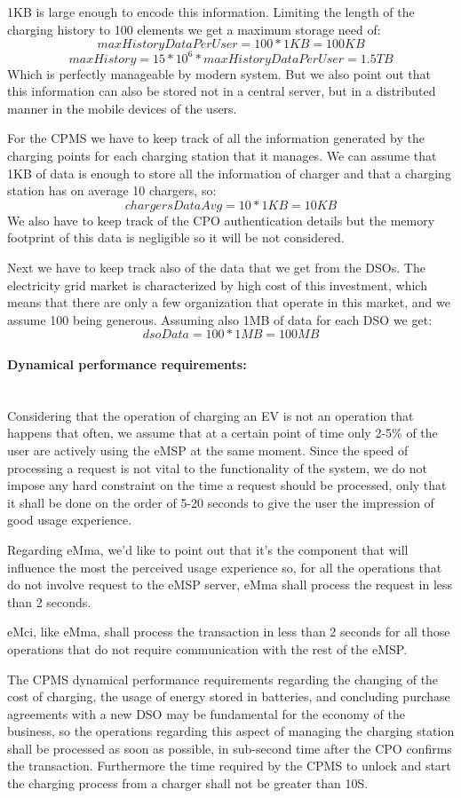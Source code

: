 1KB is large enough to encode this information. Limiting the length of the charging history to 100 elements we get a maximum storage need of:
\[ maxHistoryDataPerUser = 100 * 1KB = 100 KB\]
\[ maxHistory = 15 * 10^6 * maxHistoryDataPerUser = 1.5 TB\]
Which is perfectly manageable by modern system. But we also point out that this information can also be stored not in a central server, but in a distributed manner in the mobile devices of the users.
\par
\medskip
For the CPMS we have to keep track of all the information generated by the charging points for each charging station that it manages. We can assume that 1KB of data is enough to store all the information of charger and that a charging station has on average 10 chargers, so:
\[ chargersDataAvg = 10 * 1KB = 10 KB \]
We also have to keep track of the CPO authentication details but the memory footprint of this data is negligible so it will be not considered.
\par
Next we have to keep track also of the data that we get from the DSOs. The electricity grid market is characterized by high cost of this investment, which means that there are only a few organization that operate in this market, and we assume 100 being generous. Assuming also 1MB of data for each DSO we get:
\[ dsoData = 100 * 1MB = 100 MB \]
\medskip

\paragraph{Dynamical performance requirements:}\mbox{}\\
Considering that the operation of charging an EV is not an operation that happens that often, we assume that at a certain point of time only 2-5\% of the user are actively using the eMSP at the same moment. Since the speed of processing a request is not vital to the functionality of the system, we do not impose any hard constraint on the time a request should be processed, only that it shall be done on the order of 5-20 seconds to give the user the impression of good usage experience.
\medskip
\par
Regarding eMma, we'd like to point out that it's the component that will influence the most the perceived usage experience so, for all the operations that do not involve request to the eMSP server, eMma shall process the request in less than 2 seconds.
\medskip
\par
eMci, like eMma, shall process the transaction in less than 2 seconds for all those operations that do not require communication with the rest of the eMSP.
\medskip
\par
The CPMS dynamical performance requirements regarding the changing of the cost of charging, the usage of energy stored in batteries, and concluding purchase agreements with a new DSO may be fundamental for the economy of the business, so the operations regarding this aspect of managing the charging station shall be processed as soon as possible, in sub-second time after the CPO confirms the transaction. Furthermore the time required by the CPMS to unlock and start the charging process from a charger shall not be greater than 10S. 